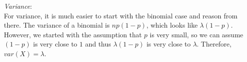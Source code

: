 \textit{Variance}: \\
For variance, it is much easier to start with the binomial case and reason from there. The variance of a binomial is $np(1-p)$, which looks like $\lambda (1-p)$. However, we started with the assumption that $p$ is very small, so we can assume $(1-p)$ is very close to $1$ and thus $\lambda (1-p)$ is very close to $\lambda$. Therefore, $var(X) = \lambda$. 